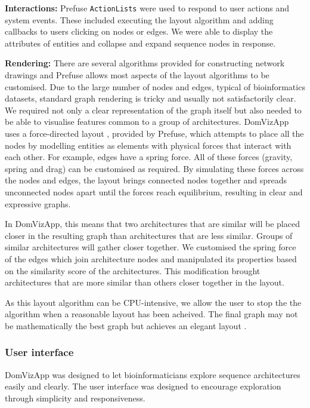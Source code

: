 \textbf{Interactions:} Prefuse \texttt{ActionLists} were used to respond to user actions and system events. These included executing the layout algorithm and adding callbacks to users clicking on nodes or edges. We were able to display the attributes of entities and collapse and expand sequence nodes in response.

\textbf{Rendering:} There are several algorithms provided for constructing network drawings and Prefuse allows most aspects of the layout algorithms to be customised. Due to the large number of nodes and edges, typical of bioinformatics datasets, standard graph rendering is tricky and usually not satisfactorily clear. We required not only a clear representation of the graph itself but also needed to be able to visualise features common to a group of architectures. DomVizApp uses a force-directed layout \cite{force}, provided by Prefuse, which attempts to place all the nodes by modelling entities as elements with physical forces that interact with each other. For example, edges have a spring force. All of these forces (gravity, spring and drag) can be customised as required. By simulating these forces across the nodes and edges, the layout brings connected nodes together and spreads unconnected nodes apart until the forces reach equilibrium, resulting in clear and expressive graphs. 

In DomVizApp, this means that two architectures that are similar will be placed closer in the resulting graph than architectures that are less similar. Groups of similar architectures will gather closer together. We customised the spring force of the edges which join architecture nodes and manipulated its properties based on the similarity score of the architectures. This modification brought architectures that are more similar than others closer together in the layout.

As this layout algorithm can be CPU-intensive, we allow the user to stop the the algorithm when a reasonable layout has been acheived. The final graph may not be mathematically the best graph but achieves an elegant layout \cite{force}.

\subsubsection{User interface}
DomVizApp was designed to let bioinformaticians explore sequence architectures easily and clearly. The user interface was designed to encourage exploration through simplicity and responsiveness.

